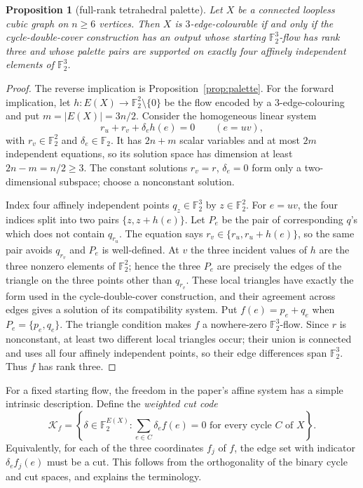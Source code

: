 \documentclass[11pt,a4paper]{article}
\newtheorem{proposition}[theorem]{Proposition}
\theoremstyle{definition}
\theoremstyle{remark}
\begin{document}
\begin{proposition}[full-rank tetrahedral palette]\label{prop:full-rank-palette}
Let $X$ be a connected loopless cubic graph on $n\ge6$ vertices.  Then $X$ is $3$-edge-colourable if and only if the cycle-double-cover construction has an output whose starting $\mathbb F_2^3$-flow has rank three and whose palette pairs are supported on exactly four affinely independent elements of $\mathbb F_2^3$.
\end{proposition}
\begin{proof}
The reverse implication is Proposition~\ref{prop:palette}.  For the forward implication, let $h\colon E(X)\to\mathbb F_2^2\setminus\{0\}$ be the flow encoded by a $3$-edge-colouring and put $m=|E(X)|=3n/2$.  Consider the homogeneous linear system
\[
 r_u+r_v+\delta_e h(e)=0\qquad(e=uv),
\]
with $r_v\in\mathbb F_2^2$ and $\delta_e\in\mathbb F_2$.  It has $2n+m$ scalar variables and at most $2m$ independent equations, so its solution space has dimension at least $2n-m=n/2\ge3$.  The constant solutions $r_v=r$, $\delta_e=0$ form only a two-dimensional subspace; choose a nonconstant solution.

Index four affinely independent points $q_z\in\mathbb F_2^3$ by $z\in\mathbb F_2^2$.  For $e=uv$, the four indices split into two pairs $\{z,z+h(e)\}$.  Let $P_e$ be the pair of corresponding $q$'s which does not contain $q_{r_u}$.  The equation says $r_v\in\{r_u,r_u+h(e)\}$, so the same pair avoids $q_{r_v}$ and $P_e$ is well-defined.  At $v$ the three incident values of $h$ are the three nonzero elements of $\mathbb F_2^2$; hence the three $P_e$ are precisely the edges of the triangle on the three points other than $q_{r_v}$.  These local triangles have exactly the form used in the cycle-double-cover construction, and their agreement across edges gives a solution of its compatibility system.  Put $f(e)=p_e+q_e$ when $P_e=\{p_e,q_e\}$.  The triangle condition makes $f$ a nowhere-zero $\mathbb F_2^3$-flow.  Since $r$ is nonconstant, at least two different local triangles occur; their union is connected and uses all four affinely independent points, so their edge differences span $\mathbb F_2^3$.  Thus $f$ has rank three.
\end{proof}

For a fixed starting flow, the freedom in the paper's affine system has a simple intrinsic description.  Define the \emph{weighted cut code}
\begin{equation}\label{eq:weighted-cut-code}
 \mathcal K_f=\left\{\delta\in\mathbb F_2^{E(X)}:
 \sum_{e\in C}\delta_e f(e)=0\text{ for every cycle }C\text{ of }X\right\}.
\end{equation}
Equivalently, for each of the three coordinates $f_j$ of $f$, the edge set with indicator $\delta_e f_j(e)$ must be a cut.  This follows from the orthogonality of the binary cycle and cut spaces, and explains the terminology.
\end{document}
